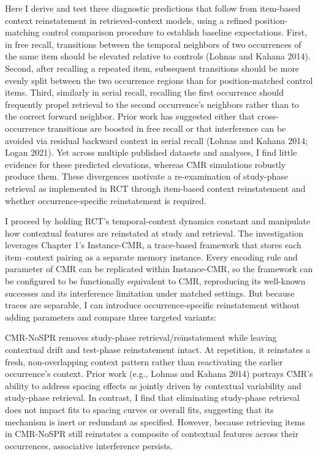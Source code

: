 \documentclass[
  letterpaper,
  11pt,
  english,
  singlespacing,
  headsepline]{MastersDoctoralThesis}
\begin{document}
Here I derive and test three diagnostic predictions that follow from
item-based context reinstatement in retrieved-context models, using a
refined position-matching control comparison procedure to establish
baseline expectations. First, in free recall, transitions between the
temporal neighbors of two occurrences of the same item should be
elevated relative to controls (Lohnas and Kahana 2014). Second, after
recalling a repeated item, subsequent transitions should be more evenly
split between the two occurrence regions than for position-matched
control items. Third, similarly in serial recall, recalling the first
occurrence should frequently propel retrieval to the second occurrence's
neighbors rather than to the correct forward neighbor. Prior work has
suggested either that cross-occurrence transitions are boosted in free
recall or that interference can be avoided via residual backward context
in serial recall (Lohnas and Kahana 2014; Logan 2021). Yet across
multiple published datasets and analyses, I find little evidence for
these predicted elevations, whereas CMR simulations robustly produce
them. These divergences motivate a re-examination of study-phase
retrieval as implemented in RCT through item-based context reinstatement
and whether occurrence-specific reinstatement is required.

I proceed by holding RCT's temporal-context dynamics constant and
manipulate how contextual features are reinstated at study and
retrieval. The investigation leverages Chapter 1's Instance-CMR, a
trace-based framework that stores each item--context pairing as a
separate memory instance. Every encoding rule and parameter of CMR can
be replicated within Instance-CMR, so the framework can be configured to
be functionally equivalent to CMR, reproducing its well-known successes
and its interference limitation under matched settings. But because
traces are separable, I can introduce occurrence-specific reinstatement
without adding parameters and compare three targeted variants:

CMR-NoSPR removes study-phase retrieval/reinstatement while leaving
contextual drift and test-phase reinstatement intact. At repetition, it
reinstates a fresh, non-overlapping context pattern rather than
reactivating the earlier occurrence's context. Prior work (e.g., Lohnas
and Kahana 2014) portrays CMR's ability to address spacing effects as
jointly driven by contextual variability and study-phase retrieval. In
contrast, I find that eliminating study-phase retrieval does not impact
fits to spacing curves or overall fits, suggesting that its mechanism is
inert or redundant as specified. However, because retrieving items in
CMR-NoSPR still reinstates a composite of contextual features across
their occurrences, associative interference persists.
\end{document}
